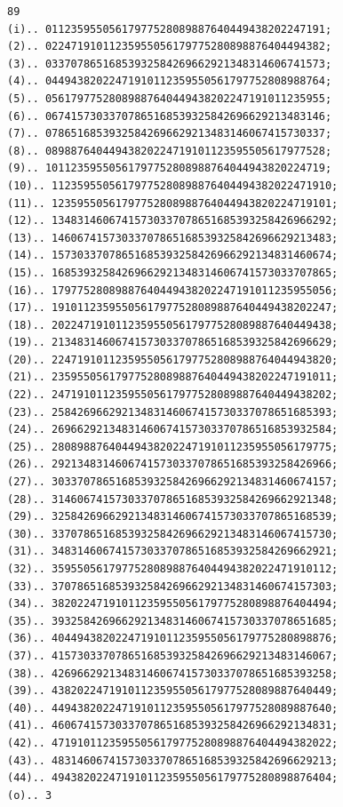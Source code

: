 \documentclass[10pt,a4paper]{article}
\begin{document}
\newpage
\setcounter{page}{424}

\begin{verbatim}
89
(i).. 01123595505617977528089887640449438202247191;
(2).. 02247191011235955056179775280898876404494382;
(3).. 03370786516853932584269662921348314606741573;
(4).. 04494382022471910112359550561797752808988764;
(5).. 05617977528089887640449438202247191011235955;
(6).. 06741573033707865168539325842696629213483146;
(7).. 07865168539325842696629213483146067415730337;
(8).. 08988764044943820224719101123595505617977528;
(9).. 10112359550561797752808988764044943820224719;
(10).. 11235955056179775280898876404494382022471910;
(11).. 12359550561797752808988764044943820224719101;
(12).. 13483146067415730337078651685393258426966292;
(13).. 14606741573033707865168539325842696629213483;
(14).. 15730337078651685393258426966292134831460674;
(15).. 16853932584269662921348314606741573033707865;
(16).. 17977528089887640449438202247191011235955056;
(17).. 19101123595505617977528089887640449438202247;
(18).. 20224719101123595505617977528089887640449438;
(19).. 21348314606741573033707865168539325842696629;
(20).. 22471910112359550561797752808988764044943820;
(21).. 23595505617977528089887640449438202247191011;
(22).. 24719101123595505617977528089887640449438202;
(23).. 25842696629213483146067415730337078651685393;
(24).. 26966292134831460674157303370786516853932584;
(25).. 28089887640449438202247191011235955056179775;
(26).. 29213483146067415730337078651685393258426966;
(27).. 30337078651685393258426966292134831460674157;
(28).. 31460674157303370786516853932584269662921348;
(29).. 32584269662921348314606741573033707865168539;
(30).. 33707865168539325842696629213483146067415730;
(31).. 34831460674157303370786516853932584269662921;
(32).. 35955056179775280898876404494382022471910112;
(33).. 37078651685393258426966292134831460674157303;
(34).. 38202247191011235955056179775280898876404494;
(35).. 39325842696629213483146067415730337078651685;
(36).. 40449438202247191011235955056179775280898876;
(37).. 41573033707865168539325842696629213483146067;
(38).. 42696629213483146067415730337078651685393258;
(39).. 43820224719101123595505617977528089887640449;
(40).. 44943820224719101123595505617977528089887640;
(41).. 46067415730337078651685393258426966292134831;
(42).. 47191011235955056179775280898876404494382022;
(43).. 48314606741573033707865168539325842696629213;
(44).. 49438202247191011235955056179775280898876404;
(o).. 3
\end{verbatim}

\newpage
\setcounter{page}{425}
\end{document}
